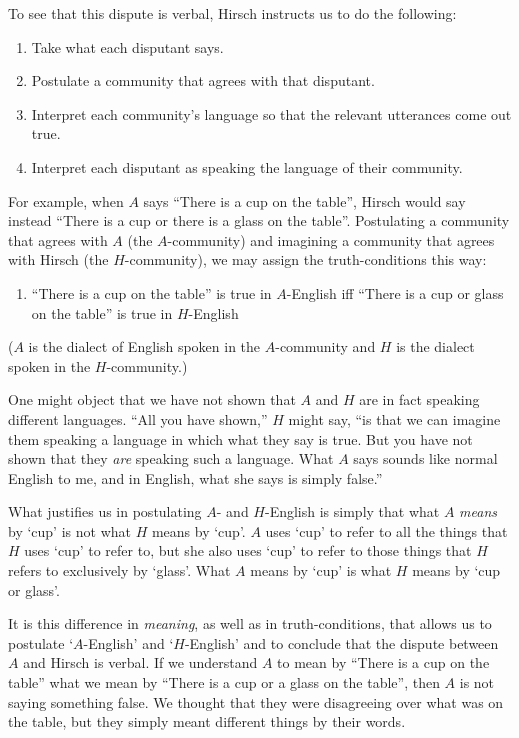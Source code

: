 \documentclass[11pt]{article}
\begin{document}
\begin{spacing}{1.25}
To see that this dispute is verbal, Hirsch instructs us to do the
following:

\begin{enumerate}
  \item Take what each disputant says.
  \item Postulate a community that agrees with that disputant.
  \item Interpret each community's language so that the relevant
    utterances come out true.
  \item Interpret each disputant as speaking the language of their
    community.
\end{enumerate}

For example, when $A$ says ``There is a cup on the table'', Hirsch
would say instead ``There is a cup or there is a glass on the table''.
Postulating a community that agrees with $A$ (the $A$-community) and
imagining a community that agrees with Hirsch (the $H$-community), we
may assign the truth-conditions this way:
\begin{enumerate}[itemindent=25pt, label=(T)]
    \item ``There is a cup on the table'' is true in $A$-English iff
    ``There is a cup or glass on the table'' is true in $H$-English
\end{enumerate}
($A$ is the dialect of English spoken in the $A$-community and $H$ is
the dialect spoken in the $H$-community.)

One might object that we have not shown that $A$ and $H$ are in fact
speaking different languages.  ``All you have shown,'' $H$ might say,
``is that we can imagine them speaking a language in which what they
say is true.  But you have not shown that they {\em are} speaking such
a language.  What $A$ says sounds like normal English to me, and in
English, what she says is simply false.''

What justifies us in postulating $A$- and $H$-English is simply that
what $A$ {\em means} by `cup' is not what $H$ means by `cup'.  $A$
uses `cup' to refer to all the things that $H$ uses `cup' to refer to,
but she also uses `cup' to refer to those things that $H$ refers to
exclusively by `glass'.  What $A$ means by `cup' is what $H$ means by
`cup or glass'.

It is this difference in {\em meaning}, as well as in
truth-conditions, that allows us to postulate `$A$-English' and
`$H$-English' and to conclude that the dispute between $A$ and Hirsch
is verbal. If we understand $A$ to mean by ``There is a cup on the
table'' what we mean by ``There is a cup or a glass on the table'',
then $A$ is not saying something false.  We thought that they were
disagreeing over what was on the table, but they simply meant
different things by their words.


\end{spacing}
\end{document}
